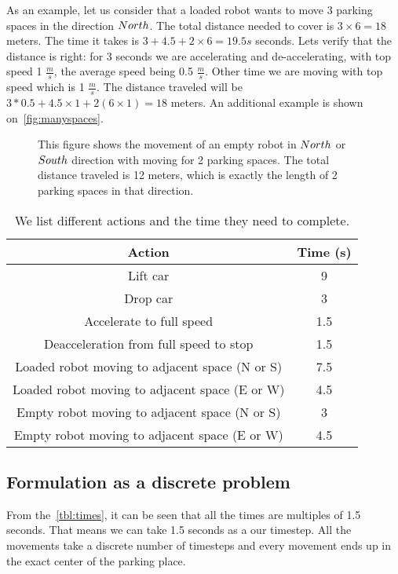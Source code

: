 As an example, let us consider that a loaded robot wants to move 3
parking spaces in the direction $North$. The total distance needed to cover is
$3\times 6 = 18$ meters. The time it takes is $3 + 4.5 + 2 \times 6 = 19.5s$
seconds. Lets verify that the distance is right: for 3 seconds we are
accelerating and de-accelerating, with top speed 1 $\frac{m}{s}$, the average
speed being 0.5 $\frac{m}{s}$. Other time we are moving with top speed which is 1
$\frac{m}{s}$. The distance traveled will be $3 * 0.5 + 4.5 \times 1 + 2(6
\times 1) = 18$ meters. An additional example is shown
on~\autoref{fig:manyspaces}.
\begin{figure}[h]
    \begin{center}
        
        \caption{This figure shows the movement of an empty robot in $North$ or
            $South$ direction with moving for 2 parking spaces. The total distance
            traveled is 12 meters, which is exactly the length of 2 parking spaces in
        that direction.}
        \label{fig:manyspaces}
    \end{center}
\end{figure}

\begin{table}
    \begin{center}
        \begin{tabular}{| c | c |}
            \hline
            Action & Time (s)\\
            \hline
            Lift car & 9\\
            Drop car & 3\\
            Accelerate to full speed & 1.5\\
            Deacceleration from full speed to stop & 1.5\\
            Loaded robot moving to adjacent space (N or S) & 7.5\\
            Loaded robot moving to adjacent space (E or W) & 4.5\\
            Empty robot moving to adjacent space (N or S) & 3\\
            Empty robot moving to adjacent space (E or W) & 4.5\\
            \hline
        \end{tabular}
        \caption{We list different actions and the time they need to complete.}
        \label{tbl:times}
    \end{center}
\end{table}
\subsection{Formulation as a discrete problem}
\label{sec:discrete problem}
From the~\autoref{tbl:times}, it can be seen that all the times are multiples
of 1.5 seconds. That means we can take 1.5 seconds as a our timestep. All the movements take a discrete number of timesteps and every movement ends up in the exact center of the parking place.

